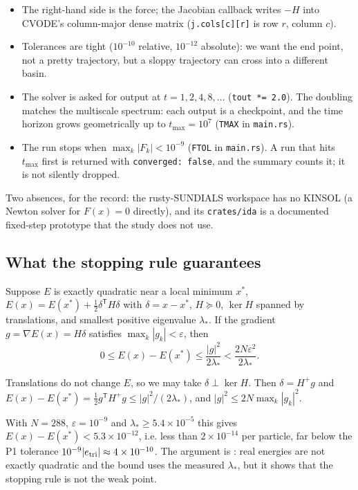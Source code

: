 \begin{itemize}
\item The right-hand side is the force; the Jacobian callback writes $-H$ into CVODE's column-major dense matrix
(\texttt{j.cols[c][r]} is row $r$, column $c$).
\item Tolerances are tight ($10^{-10}$ relative, $10^{-12}$ absolute): we want the end point, not a pretty trajectory, but
a sloppy trajectory can cross into a different basin.
\item The solver is asked for output at $t=1,2,4,8,\dots$ (\texttt{tout *= 2.0}). The doubling matches the multiscale
spectrum: each output is a checkpoint, and the time horizon grows geometrically up to $t_{\max}=10^7$
(\texttt{TMAX} in \texttt{main.rs}).
\item The run stops when $\max_k|F_k|<10^{-9}$ (\texttt{FTOL} in \texttt{main.rs}). A run that hits $t_{\max}$ first is
returned with \texttt{converged: false}, and the summary counts it; it is not silently dropped.
\end{itemize}
Two absences, for the record: the rusty-SUNDIALS workspace has no KINSOL (a Newton solver for $F(x)=0$ directly), and
its \texttt{crates/ida} is a documented fixed-step prototype that the study does not use.

\subsection{What the stopping rule guarantees}
\begin{proposition}\label{prop:stop}
\tierC{} Suppose $E$ is exactly quadratic near a local minimum $x^*$, $E(x)=E(x^*)+\frac12\delta^{\mathsf T}H\delta$
with $\delta=x-x^*$, $H\succeq0$, $\ker H$ spanned by translations, and smallest positive eigenvalue $\lambda_*$. If the
gradient $g=\nabla E(x)=H\delta$ satisfies $\max_k|g_k|<\varepsilon$, then
\begin{equation}
0\le E(x)-E(x^*)\le\frac{|g|^2}{2\lambda_*}<\frac{2N\varepsilon^2}{2\lambda_*}.
\end{equation}
\end{proposition}
\begin{humanproof}
Translations do not change $E$, so we may take $\delta\perp\ker H$. Then $\delta=H^+g$ and
$E(x)-E(x^*)=\frac12g^{\mathsf T}H^+g\le|g|^2/(2\lambda_*)$, and $|g|^2\le2N\max_k|g_k|^2$.
\end{humanproof}
With $N=288$, $\varepsilon=10^{-9}$ and $\lambda_*\ge5.4\times10^{-5}$ this gives $E(x)-E(x^*)<5.3\times10^{-12}$, i.e.
less than $2\times10^{-14}$ per particle, far below the P1 tolerance $10^{-9}|e_{\rm tri}|\approx4\times10^{-10}$. The
argument is \tierC: real energies are not exactly quadratic and the bound uses the measured $\lambda_*$, but it shows that
the stopping rule is not the weak point.

